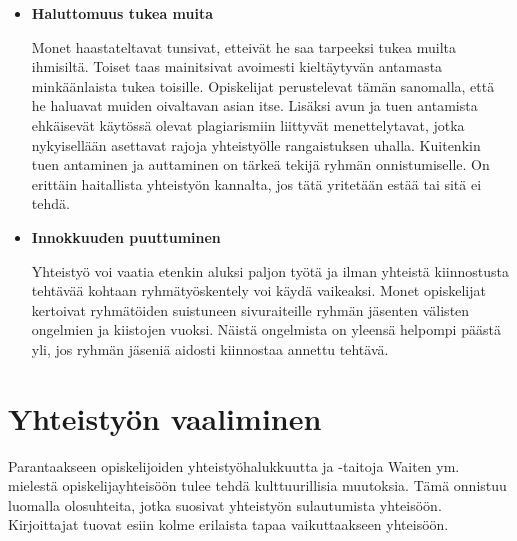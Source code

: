 \documentclass[finnish]{../tktltiki2}
\theoremstyle{definition}
\theoremstyle{remark}
\begin{document}
\begin{itemize}
\item {\bf Haluttomuus tukea muita}

Monet haastateltavat tunsivat, etteivät he saa tarpeeksi tukea muilta ihmisiltä. Toiset taas mainitsivat avoimesti kieltäytyvän antamasta minkäänlaista tukea toisille. Opiskelijat perustelevat tämän sanomalla, että he haluavat muiden oivaltavan asian itse. Lisäksi avun ja tuen antamista ehkäisevät käytössä olevat plagiarismiin liittyvät menettelytavat, jotka nykyisellään asettavat rajoja yhteistyölle rangaistuksen uhalla. Kuitenkin tuen antaminen ja auttaminen on tärkeä tekijä ryhmän onnistumiselle. On erittäin haitallista yhteistyön kannalta, jos tätä yritetään estää tai sitä ei tehdä.

\item {\bf Innokkuuden puuttuminen}

Yhteistyö voi vaatia etenkin aluksi paljon työtä ja ilman yhteistä kiinnostusta tehtävää kohtaan ryhmätyöskentely voi käydä vaikeaksi. Monet opiskelijat kertoivat ryhmätöiden suistuneen sivuraiteille ryhmän jäsenten välisten ongelmien ja kiistojen vuoksi. Näistä ongelmista on yleensä helpompi päästä yli, jos ryhmän jäseniä aidosti kiinnostaa annettu tehtävä.

\end{itemize}

\section{Yhteistyön vaaliminen}

Parantaakseen opiskelijoiden yhteistyöhalukkuutta ja -taitoja Waiten ym. mielestä opiskelijayhteisöön tulee tehdä kulttuurillisia muutoksia. Tämä onnistuu luomalla olosuhteita, jotka suosivat yhteistyön sulautumista yhteisöön. Kirjoittajat tuovat esiin kolme erilaista tapaa vaikuttaakseen yhteisöön.
\end{document}
